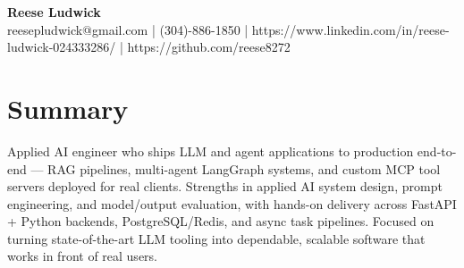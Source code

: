\documentclass[10pt]{article}
\begin{document}
\begin{center}
{\fontsize{14}{16}\selectfont\bfseries Reese Ludwick}\\[1pt]
{\fontsize{9}{11}\selectfont reesepludwick@gmail.com | (304)-886-1850 | https://www.linkedin.com/in/reese-ludwick-024333286/ | https://github.com/reese8272}
\end{center}
\vspace{-2pt}
\section*{Summary}
\noindent Applied AI engineer who ships LLM and agent applications to production end-to-end — RAG pipelines, multi-agent LangGraph systems, and custom MCP tool servers deployed for real clients. Strengths in applied AI system design, prompt engineering, and model/output evaluation, with hands-on delivery across FastAPI + Python backends, PostgreSQL/Redis, and async task pipelines. Focused on turning state-of-the-art LLM tooling into dependable, scalable software that works in front of real users.\par
\end{document}
